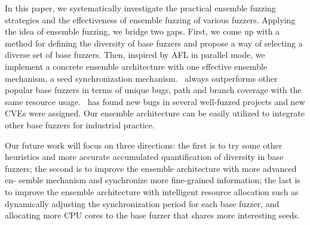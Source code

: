 In this paper, we systematically investigate the practical ensemble fuzzing strategies and the effectiveness of ensemble fuzzing of various fuzzers. %
%
Applying the idea of ensemble fuzzing, we bridge two gaps.
First, we come up with a method for defining the diversity of base fuzzers and propose a way of selecting  a diverse set of base fuzzers. 
Then, inspired by AFL in parallel mode, we implement a concrete ensemble architecture with one effective ensemble mechanism, a seed synchronization mechanism.
\EnFuzz ~always outperforms other popular base fuzzers in terms of unique bugs, path and branch coverage with the same resource usage. 
\EnFuzz ~has found \bugnum new bugs in several well-fuzzed projects and \cvenum new CVEs were assigned.
Our ensemble architecture can be easily utilized to integrate other base fuzzers for industrial practice. 

Our future work will focus on three directions: the first is to try some other heuristics and more accurate accumulated quantification of diversity in base fuzzers; the second is to improve the ensemble architecture with more advanced en- semble mechanism and synchronize more fine-grained information; the last is to improve the ensemble architecture with intelligent resource allocation such as  dynamically adjusting the synchronization period for each base fuzzer, and allocating more CPU cores to the base fuzzer that shares more interesting seeds. %


